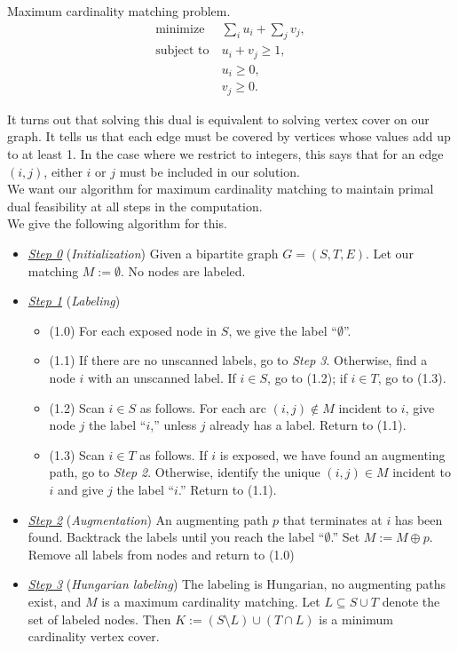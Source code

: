 \documentclass[11pt]{article}
\renewcommand{\'}{^{'}}
\begin{document}
\begin{section}{Maximum cardinality matching problem.}
\begin{align*}
	\text{minimize}\ &\sum_i u_i + \sum_j v_j,\\
	\text{subject to}\ &u_i + v_j \geq 1,\\
	                   &u_i \geq 0,\\
			   &v_j \geq 0.
\end{align*}

It turns out that solving this dual is equivalent to solving vertex cover on our graph. 
It tells us that each edge must be covered by vertices whose values add up to at least 1. 
In the case where we restrict to integers, this says that for an edge $(i,j)$, 
either $i$ or $j$ must be included in our solution.\\
We want our algorithm for maximum cardinality matching to maintain primal dual feasibility at 
all steps in the computation. 
\\
We give the following algorithm for this. 
\begin{itemize}
	\item \underline{\emph{Step 0}} (\emph{Initialization}) Given a bipartite 
		graph $G=(S,T,E)$. Let our matching $M := \emptyset$. No nodes are labeled.
	\item \underline{\emph{Step 1}} (\emph{Labeling})
		\begin{itemize}
			\item (1.0) For each exposed node in $S$, we give the label 
				``$\emptyset$''.
			\item (1.1) If there are no unscanned labels, go to \emph{Step 3}. 
				Otherwise, find a node $i$ with an unscanned label. If 
				$i\in S$, go to (1.2); if $i\in T$, go to (1.3).
			\item (1.2) Scan $i\in S$ as follows. For each arc $(i,j)\notin M$ 
				incident to $i$, give node $j$ the label ``$i$,'' unless 
				$j$ already has a label. Return to (1.1).
			\item (1.3) Scan $i\in T$ as follows. If $i$ is exposed, we have 
				found an augmenting path, go to \emph{Step 2}. Otherwise, 
				identify the unique $(i,j)\in M$ incident to $i$ and give 
				$j$ the label ``$i$.'' Return to (1.1).
		\end{itemize}
	\item \underline{\emph{Step 2}} (\emph{Augmentation})
		  An augmenting path $p$ that terminates at $i$ has been found. Backtrack the 
		  labels until you reach the label ``$\emptyset$.'' Set 
		  $M := M\oplus p$. Remove all labels from nodes and return to (1.0)
	  \item \underline{\emph{Step 3}} (\emph{Hungarian labeling})
		  The labeling is Hungarian, no augmenting paths exist, and $M$ is a 
		  maximum cardinality matching. Let $L\subseteq S\cup T$ denote the set 
		  of labeled nodes. Then $K := (S\setminus L) \cup (T\cap L)$ is a minimum 
		  cardinality vertex cover. 
\end{itemize}


\end{section}
\end{document}
